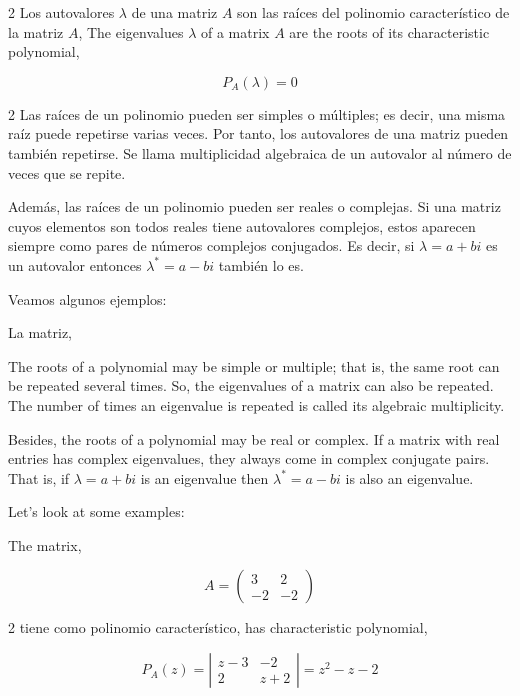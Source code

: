\begin{paracol}{2}
Los autovalores $\lambda$ de una matriz $A$ son las raíces del polinomio característico de la matriz $A$,
\switchcolumn
The eigenvalues $\lambda$ of a matrix $A$ are the roots of its characteristic polynomial,
\end{paracol}
\begin{equation*}
P_A(\lambda)=0
\end{equation*}
\begin{paracol}{2}
Las raíces de un polinomio pueden ser simples o múltiples; es decir, una misma raíz puede repetirse varias veces. Por tanto, los autovalores de una matriz pueden también repetirse. Se llama multiplicidad algebraica de un autovalor al número de veces que se repite.

Además, las raíces de un polinomio pueden ser reales o complejas. Si una matriz cuyos elementos son todos reales tiene autovalores complejos, estos aparecen siempre como pares de números complejos conjugados. Es decir, si $\lambda =a+bi$ es un autovalor entonces $\lambda^*=a-bi$ también lo es.

Veamos algunos ejemplos:

La matriz,

\switchcolumn
The roots of a polynomial may be simple or multiple; that is, the same root can be repeated several times. So, the eigenvalues of a matrix can also be repeated. The number of times an eigenvalue is repeated is called its algebraic multiplicity.

Besides, the roots of a polynomial may be real or complex. If a matrix with real entries has complex eigenvalues, they always come in complex conjugate pairs. That is, if $\lambda =a+bi$ is an eigenvalue then $\lambda^*=a-bi$ is also an eigenvalue.

Let's look at some examples:

The matrix, 
\end{paracol}
\begin{equation*}
A=\begin{pmatrix}
3& 2\\
-2& -2
\end{pmatrix}
\end{equation*}
\begin{paracol}{2}
tiene como polinomio característico,
\switchcolumn
has characteristic polynomial, 
\end{paracol}
\begin{equation*}
P_A(z)=\left\vert\begin{matrix}
z-3& -2\\
2& z+2 
\end{matrix} \right\vert=z^2-z-2
\end{equation*}
